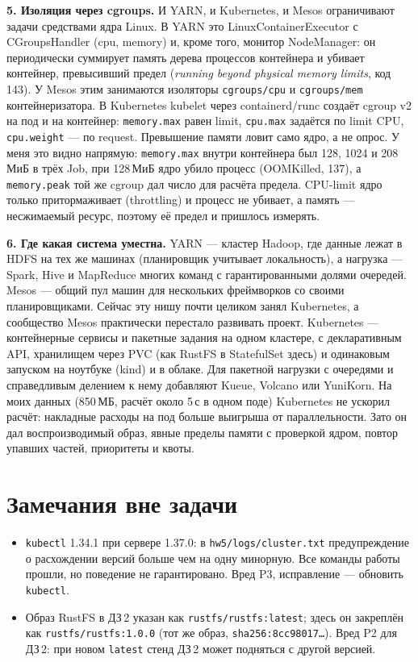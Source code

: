 \documentclass[11pt,a4paper]{article}
\DeclareRobustCommand{\code}[1]{\begingroup\renewcommand{\_}{\textunderscore\allowbreak}\renewcommand{\slash}{/\allowbreak}\texttt{#1}\endgroup}
\newcommand{\logf}[1]{\code{hw5\slash logs\slash #1}}
\begin{document}
\textbf{5. Изоляция через cgroups.} И YARN, и Kubernetes, и Mesos ограничивают задачи средствами ядра Linux. В YARN это LinuxContainerExecutor с CGroupsHandler (cpu, memory) и, кроме того, монитор NodeManager: он периодически суммирует память дерева процессов контейнера и убивает контейнер, превысивший предел (\textit{running beyond physical memory limits}, код 143). У Mesos этим занимаются изоляторы \code{cgroups/cpu} и \code{cgroups/mem} контейнеризатора. В Kubernetes kubelet через containerd/runc создаёт cgroup v2 на под и на контейнер: \code{memory.max} равен limit, \code{cpu.max} задаётся по limit CPU, \code{cpu.weight} --- по request. Превышение памяти ловит само ядро, а не опрос. У меня это видно напрямую: \code{memory.max} внутри контейнера был 128, 1024 и 208\,МиБ в трёх Job, при 128\,МиБ ядро убило процесс (OOMKilled, 137), а \code{memory.peak} той же cgroup дал число для расчёта предела. CPU-limit ядро только притормаживает (throttling) и процесс не убивает, а память --- несжимаемый ресурс, поэтому её предел и пришлось измерять.

\textbf{6. Где какая система уместна.} YARN --- кластер Hadoop, где данные лежат в HDFS на тех же машинах (планировщик учитывает локальность), а нагрузка --- Spark, Hive и MapReduce многих команд с гарантированными долями очередей. Mesos --- общий пул машин для нескольких фреймворков со своими планировщиками. Сейчас эту нишу почти целиком занял Kubernetes, а сообщество Mesos практически перестало развивать проект. Kubernetes --- контейнерные сервисы и пакетные задания на одном кластере, с декларативным API, хранилищем через PVC (как RustFS в StatefulSet здесь) и одинаковым запуском на ноутбуке (kind) и в облаке. Для пакетной нагрузки с очередями и справедливым делением к нему добавляют Kueue, Volcano или YuniKorn. На моих данных (850\,МБ, расчёт около 5\,с в одном поде) Kubernetes не ускорил расчёт: накладные расходы на под больше выигрыша от параллельности. Зато он дал воспроизводимый образ, явные пределы памяти с проверкой ядром, повтор упавших частей, приоритеты и квоты.

\section{Замечания вне задачи}

\begin{itemize}
  \item \code{kubectl} 1.34.1 при сервере 1.37.0: в \logf{00\_cluster.txt} предупреждение о расхождении версий больше чем на одну минорную. Все команды работы прошли, но поведение не гарантировано. Вред P3, исправление --- обновить \code{kubectl}.
  \item Образ RustFS в ДЗ\,2 указан как \code{rustfs\slash rustfs:latest}; здесь он закреплён как \code{rustfs\slash rustfs:1.0.0} (тот же образ, \code{sha256:8cc98017\ldots}). Вред P2 для ДЗ\,2: при новом \code{latest} стенд ДЗ\,2 может подняться с другой версией.
\end{itemize}
\end{document}
